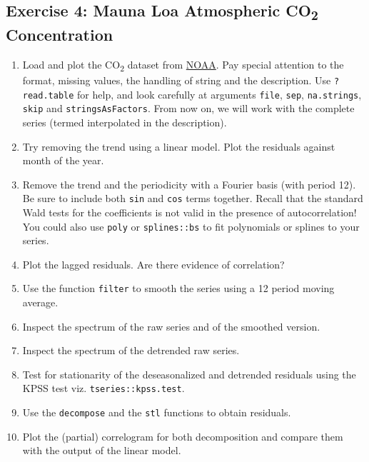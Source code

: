 \documentclass[]{book}
\providecommand{\tightlist}{%
  \setlength{\itemsep}{0pt}\setlength{\parskip}{0pt}}
\begin{document}
\subsection{\texorpdfstring{Exercise 4: Mauna Loa Atmospheric
CO\textsubscript{2}
Concentration}{Exercise 4: Mauna Loa Atmospheric CO2 Concentration}}\label{exercise-4-mauna-loa-atmospheric-co2-concentration}

\begin{enumerate}
\def\labelenumi{\arabic{enumi}.}
\tightlist
\item
  Load and plot the CO\textsubscript{2} dataset from
  \href{ftp://aftp.cmdl.noaa.gov/products/trends/co2/co2_mm_mlo.txt}{NOAA}.
  Pay special attention to the format, missing values, the handling of
  string and the description. Use \texttt{?read.table} for help, and
  look carefully at arguments \texttt{file}, \texttt{sep},
  \texttt{na.strings}, \texttt{skip} and \texttt{stringsAsFactors}. From
  now on, we will work with the complete series (termed interpolated in
  the description).
\item
  Try removing the trend using a linear model. Plot the residuals
  against month of the year.
\item
  Remove the trend and the periodicity with a Fourier basis (with period
  12). Be sure to include both \texttt{sin} and \texttt{cos} terms
  together. Recall that the standard Wald tests for the coefficients is
  not valid in the presence of autocorrelation! You could also use
  \texttt{poly} or \texttt{splines::bs} to fit polynomials or splines to
  your series.
\item
  Plot the lagged residuals. Are there evidence of correlation?
\item
  Use the function \texttt{filter} to smooth the series using a 12
  period moving average.
\item
  Inspect the spectrum of the raw series and of the smoothed version.
\item
  Inspect the spectrum of the detrended raw series.
\item
  Test for stationarity of the deseasonalized and detrended residuals
  using the KPSS test viz. \texttt{tseries::kpss.test}.
\item
  Use the \texttt{decompose} and the \texttt{stl} functions to obtain
  residuals.
\item
  Plot the (partial) correlogram for both decomposition and compare them
  with the output of the linear model.
\end{enumerate}
\end{document}
